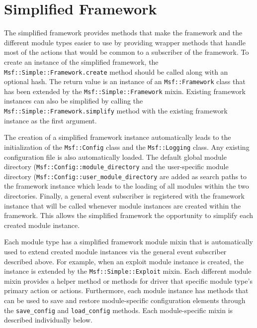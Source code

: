 \documentclass{report}
\begin{document}
    \section{Simplified Framework}

\par
The simplified framework provides methods that make the framework
and the different module types easier to use by providing wrapper
methods that handle most of the actions that would be common to a
subscriber of the framework.  To create an instance of the
simplified framework, the \texttt{Msf::Simple::Framework.create}
method should be called along with an optional hash.  The return
value is an instance of an \texttt{Msf::Framework} class that has
been extended by the \texttt{Msf::Simple::Framework} mixin. Existing
framework instances can also be simplified by calling the
\texttt{Msf::Simple::Framework.simplify} method with the existing
framework instance as the first argument.

\par
The creation of a simplified framework instance automatically leads
to the initialization of the \texttt{Msf::Config} class and the
\texttt{Msf::Logging} class.  Any existing configuration file is
also automatically loaded.  The default global module directory
(\texttt{Msf::Config::module\_directory} and the user-specific
module directory (\texttt{Msf::Config::user\_module\_directory} are
added as search paths to the framework instance which leads to the
loading of all modules within the two directories.  Finally, a
general event subscriber is registered with the framework instance
that will be called whenever module instances are created within the
framework.  This allows the simplified framework the opportunity to
simplify each created module instance.

\par
Each module type has a simplified framework module mixin that is
automatically used to extend created module instances via the
general event subscriber described above.  For example, when an
exploit module instance is created, the instance is extended by the
\texttt{Msf::Simple::Exploit} mixin.  Each different module mixin
provides a helper method or methods for driver that specific module
type's primary action or actions.  Furthermore, each module instance
has methods that can be used to save and restore module-specific
configuration elements through the \texttt{save\_config} and
\texttt{load\_config} methods.  Each module-specific mixin is
described individually below.
\end{document}
